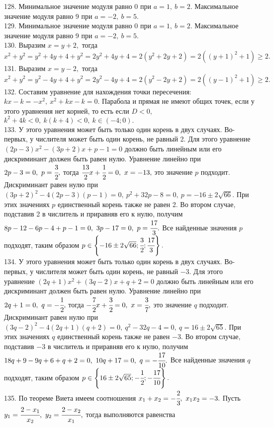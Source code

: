 128. Минимальное значение модуля равно 0 при $a=1,\ b=2.$ Максимальное значение модуля равно 9 при $a=-2,\ b=5.$\\
129. Минимальное значение модуля равно 0 при $a=1,\ b=2.$ Максимальное значение модуля равно 9 при $a=-2,\ b=5.$\\
130. Выразим $x=y+2,$ тогда $x^2+y^2=y^2+4y+4+y^2=2y^2+4y+4=2(y^2+2y+2)=2((y+1)^2+1)\geqslant2.$\\
131. Выразим $x=y-2,$ тогда $x^2+y^2=y^2-4y+4+y^2=2y^2-4y+4=2(y^2-2y+2)=2((y-1)^2+1)\geqslant2.$\\
132. Составим уравнение для нахождения точки пересечения: $kx-k=-x^2,\ x^2+kx-k=0.$ Парабола и прямая не имеют общих точек, если у этого уравнения нет корней, то есть если $D<0,$\\ $k^2+4k<0,\ k(k+4)<0,\ k\in(-4;0).$\\
133. У этого уравнения может быть только один корень в двух случаях. Во-первых, у числителя может быть один корень, не равный 2. Для этого уравнение $(2p-3)x^2-(3p+2)x+p-1=0$ должно быть линейным или его дискриминант должен быть равен нулю. Уравнение линейно при $2p-3=0,\ p=\cfrac{3}{2},$ тогда $\cfrac{13}{2}x+\cfrac{1}{2}=0,\ x=-13,$ это значение $p$ подходит. Дискриминант равен нулю при $(3p+2)^2-4(2p-3)(p-1)=0,\ p^2+32p-8=0,\ p=-16\pm2\sqrt{66}.$ При этих значениях $p$ единственный корень также не равен 2. Во втором случае, подставив 2 в числитель и приравняв его к нулю, получим $8p-12-6p-4+p-1=0,\ 3p-17=0,\ p=\cfrac{17}{3}.$ Все найденные значения $p$ подходят, таким образом $p\in\left\{-16\pm2\sqrt{66};\cfrac{3}{2};\cfrac{17}{3}\right\}.$\\
134. У этого уравнения может быть только один корень в двух случаях. Во-первых, у числителя может быть один корень, не равный $-3.$ Для этого уравнение $(2q+1)x^2+(3q-2)x+q+2=0$ должно быть линейным или его дискриминант должен быть равен нулю. Уравнение линейно при $2q+1=0,\ q=-\cfrac{1}{2},$ тогда $-\cfrac{7}{2}x+\cfrac{3}{2}=0,\ x=\cfrac{3}{7},$ это значение $q$ подходит. Дискриминант равен нулю при $(3q-2)^2-4(2q+1)(q+2)=0,\ q^2-32q-4=0,\ q=16\pm2\sqrt{65}.$ При этих значениях $q$ единственный корень также не равен $-3.$ Во втором случае, подставив $-3$ в числитель и приравняв его к нулю, получим $18q+9-9q+6+q+2=0,\ 10q+17=0,\ q=-\cfrac{17}{10}.$ Все найденные значения $q$ подходят, таким образом $p\in\left\{16\pm2\sqrt{65};-\cfrac{1}{2};-\cfrac{17}{10}\right\}.$\\
135. По теореме Виета имеем соотношения $x_1+x_2=-\cfrac{2}{3},\ x_1x_2=-3.$ Пусть $y_1=\cfrac{2-x_1}{x_2},\ y_2=\cfrac{2-x_2}{x_1},$ тогда выполняются равенства
